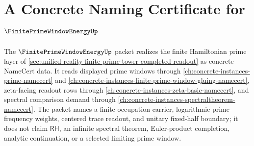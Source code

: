 \chapter{A Concrete Naming Certificate for $\FinitePrimeWindowEnergyUp$}
\label{ch:concrete-instances-finite-prime-window-energy-namecert}

The $\FinitePrimeWindowEnergyUp$ packet realizes the finite Hamiltonian prime layer of \autoref{sec:unified-reality-finite-prime-tower-completed-readout} as concrete NameCert data. It reads displayed prime windows through \autoref{ch:concrete-instances-prime-namecert} and \autoref{ch:concrete-instances-finite-prime-window-gluing-namecert}, zeta-facing readout rows through \autoref{ch:concrete-instances-zeta-basic-namecert}, and spectral comparison demand through \autoref{ch:concrete-instances-spectraltheorem-namecert}. The packet names a finite occupation carrier, logarithmic prime-frequency weights, centered trace readout, and unitary fixed-half boundary; it does not claim $\mathsf{RH}$, an infinite spectral theorem, Euler-product completion, analytic continuation, or a selected limiting prime window.

